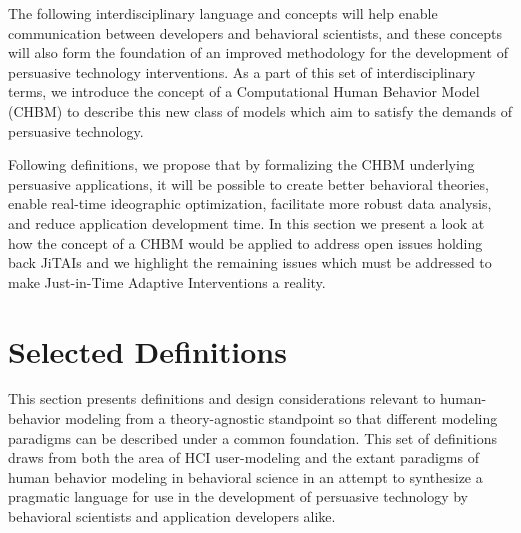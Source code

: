 \documentclass[runningheads,a4paper]{llncs}
\begin{document}
The following interdisciplinary language and concepts will help enable communication between developers and behavioral scientists, and these concepts will also form the foundation of an improved methodology for the development of persuasive technology interventions.
As a part of this set of interdisciplinary terms, we introduce the concept of a Computational Human Behavior Model (CHBM) to describe this new class of models which aim to satisfy the demands of persuasive technology.

Following definitions, we propose that by formalizing the CHBM underlying persuasive applications, it will be possible to create better behavioral theories, enable real-time ideographic optimization, facilitate more robust data analysis, and reduce application development time. 
In this section we present a look at how the concept of a CHBM would be applied to address open issues holding back JiTAIs and we highlight the remaining issues which must be addressed to make Just-in-Time Adaptive Interventions a reality.

\section{Selected Definitions}

This section presents definitions and design considerations relevant to human-behavior modeling from a theory-agnostic standpoint so that different modeling paradigms can be described under a common foundation.
This set of definitions draws from both the area of HCI user-modeling and the extant paradigms of human behavior modeling in behavioral science in an attempt to synthesize a pragmatic language for use in the development of persuasive technology by behavioral scientists and application developers alike.
\end{document}
